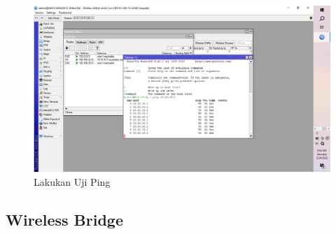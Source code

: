 \begin{enumerate}
     \begin{figure}[H]
        \centering
        \includegraphics[width=0.5\linewidth]{P1/img/15.jpeg}
        \caption{Lakukan Uji Ping}
        \label{fig:gambar4}
    \end{figure}
\end{enumerate}

\subsection{Wireless Bridge}
